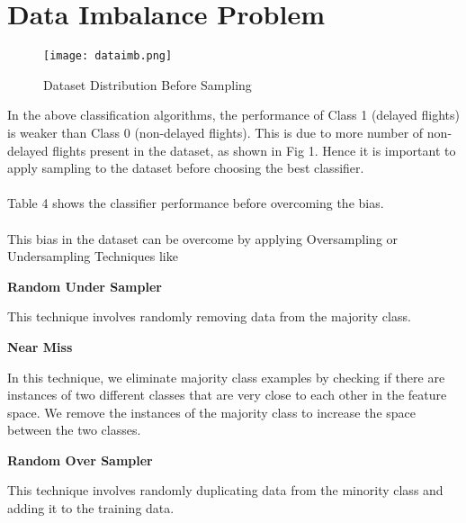 \documentclass[12pt,letter-paper]{article}
\begin{document}
    
\section{Data Imbalance Problem}        

    \begin{figure}[H]%
        \begin{center}
          \texttt{[image: dataimb.png]}%
            \caption{Dataset Distribution Before Sampling}  
        \end{center}
    \end{figure}
    
    In the above classification algorithms, the performance of Class 1 (delayed flights) is weaker than Class 0 (non-delayed flights). This is due to more number of non-delayed flights present in the dataset, as shown in Fig 1. Hence it is important to apply sampling to the dataset before choosing the best classifier. 
    
    \paragraph{}
    Table 4 shows the classifier performance before overcoming the bias.
    
    \paragraph{}
        This bias in the dataset can be overcome by applying Oversampling or Undersampling Techniques like
        \item\textbf{Random Under Sampler}
            
            This technique involves randomly removing data from the majority class.
            
        \item\textbf{Near Miss}
            
            In this technique, we eliminate majority class examples by checking if there are instances of two different classes that are very close to each other in the feature space. We remove the instances of the majority class to increase the space between the two classes.  
            
        \item\textbf{Random Over Sampler}
            
            This technique involves randomly duplicating data from the minority class and adding it to the training data.
        
\end{document}
